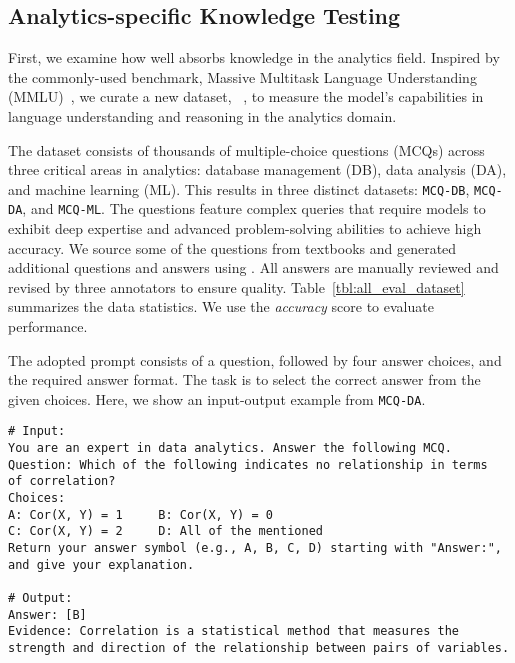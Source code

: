 \subsection{Analytics-specific Knowledge Testing}
\label{sec:analytics_mmlu}

First, we examine how well \modelname absorbs knowledge in the analytics field. Inspired by the commonly-used benchmark, Massive Multitask Language Understanding (MMLU)~\citep{hendrycks2020mmlu,wang2024mmlupro}, we curate a new dataset, ~\mmlu, to measure the model's capabilities in language understanding and reasoning in the analytics domain.

The \mmlu dataset consists of thousands of multiple-choice questions (MCQs) across three critical areas in analytics: database management (DB), data analysis (DA), and machine learning (ML). This results in three distinct datasets: \texttt{MCQ-DB}, \texttt{MCQ-DA}, and \texttt{MCQ-ML}. The questions feature complex queries that require models to exhibit deep expertise and advanced problem-solving abilities to achieve high accuracy. We source some of the questions from textbooks and generated additional questions and answers using \claudetf. All answers are manually reviewed and revised by three annotators to ensure quality. Table~\ref{tbl:all_eval_dataset} summarizes the data statistics. We use the \textit{accuracy} score to evaluate performance.

The adopted prompt consists of a question, followed by four answer choices, and the required answer format. The task is to select the correct answer from the given choices. Here, we show an input-output example from \texttt{MCQ-DA}.
\begin{tcolorbox}[left=2pt, right=0pt, top=1pt, bottom=1pt]
\begin{verbatim}
# Input: 
You are an expert in data analytics. Answer the following MCQ. 
Question: Which of the following indicates no relationship in terms
of correlation?
Choices:
A: Cor(X, Y) = 1     B: Cor(X, Y) = 0
C: Cor(X, Y) = 2     D: All of the mentioned
Return your answer symbol (e.g., A, B, C, D) starting with "Answer:",
and give your explanation.

# Output: 
Answer: [B]
Evidence: Correlation is a statistical method that measures the
strength and direction of the relationship between pairs of variables.
\end{verbatim}
\end{tcolorbox}


